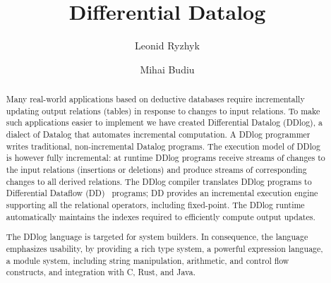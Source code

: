 \documentclass{svproc}
\author{
        Leonid Ryzhyk \and
        Mihai Budiu}
\institute{VMware Research}
\title{Differential Datalog}
\date{}
\begin{document}
\maketitle

\begin{abstract}

Many real-world applications based on deductive databases require
incrementally updating output relations (tables) in response to
changes to input relations.  To make such applications easier to
implement we have created Differential Datalog (DDlog), a dialect of
Datalog that automates incremental computation.  A DDlog programmer
writes traditional, non-incremental Datalog programs.  The execution
model of DDlog is however fully incremental: at runtime DDlog programs
receive streams of changes to the input relations (insertions or
deletions) and produce streams of corresponding changes to all derived
relations.  The DDlog compiler translates DDlog programs to
Differential Dataflow (DD)~\cite{differential-dataflow-paper}
programs; DD provides an incremental execution engine supporting all
the relational operators, including fixed-point.  The DDlog runtime
automatically maintains the indexes required to efficiently compute
output updates.

The DDlog language is targeted for system builders.  In consequence,
the language emphasizes usability, by providing a rich type system, a
powerful expression language, a module system, including string
manipulation, arithmetic, and control flow constructs, and integration
with C, Rust, and Java.
\end{abstract}










\end{document}
